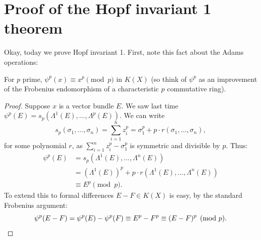 \section{Proof of the Hopf invariant 1 theorem} %
\label{ProofOfHopfInvariantOne}
\ifx\OutputProofOfHopfInvariantOne\undefined\else
Okay, today we prove Hopf invariant 1.  First, note this fact about the Adams operations:
\begin{lem}\label{frobeniuslemma}
For $p$ prime, $\psi^p(x) \equiv x^p \pmod{p}$ in $K(X)$ (so think of $\psi^p$ as an improvement of the Frobenius endomorphism of a characteristic $p$ commutative ring).
\end{lem}
\begin{proof}
Suppose $x$ is a vector bundle $E$.  We saw last time $\psi^p(E) = s_p(\Lambda^1 (E), \ldots, \Lambda^p (E))$. We can write
\[s_p(\sigma_1, \ldots, \sigma_n) = \sum_{i=1}^n z_i^p = \sigma_1^p + p \cdot r(\sigma_1, \ldots, \sigma_n),\]
for some polynomial $r$, as $\sum_{i=1}^n z_i^p - \sigma_1^p$ is symmetric and divisible by $p$.  Thus:
\begin{align*}
\psi^p(E) & = s_p(\Lambda^1 (E), \ldots, \Lambda^n (E)) \\
& = (\Lambda^1 (E))^p + p \cdot r(\Lambda^1 (E), \ldots, \Lambda^n (E)) \\
& \equiv E^p \pmod p.
\end{align*}
To extend this to formal differences $E-F\in K(X)$ is easy, by the standard Frobenius argument:
\[\psi^p(E - F)  = \psi^p(E) - \psi^p(F)
\equiv E^p-F^p\equiv(E-F)^p \pmod{p}.\qedhere\]
\end{proof}

